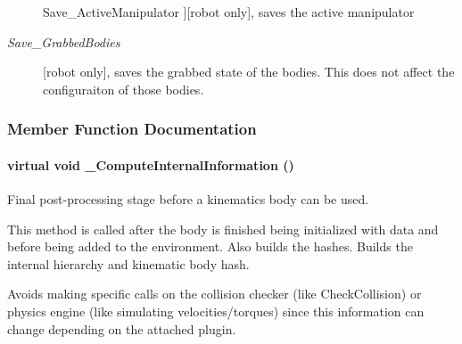 \begin{Desc}
\begin{description}
{\hypertarget{classOpenRAVE_1_1KinBody_ac26237c033a41ea5d14733a01e1dd388abfdea67aabc497c0ecd461a332cf17e1}{
Save\_\-ActiveManipulator}
\label{classOpenRAVE_1_1KinBody_ac26237c033a41ea5d14733a01e1dd388abfdea67aabc497c0ecd461a332cf17e1}
}]\mbox{[}robot only\mbox{]}, saves the active manipulator \item[{\em 
\hypertarget{classOpenRAVE_1_1KinBody_ac26237c033a41ea5d14733a01e1dd388aa8b99f22784feffbd182ad71f8eb8a6f}{
Save\_\-GrabbedBodies}
\label{classOpenRAVE_1_1KinBody_ac26237c033a41ea5d14733a01e1dd388aa8b99f22784feffbd182ad71f8eb8a6f}
}]\mbox{[}robot only\mbox{]}, saves the grabbed state of the bodies. This does not affect the configuraiton of those bodies. \end{description}
\end{Desc}



\subsubsection{Member Function Documentation}
\hypertarget{classOpenRAVE_1_1KinBody_a3a10edb8cb573ac97bfed0e05dc2a29a}{
\paragraph[{\_\-ComputeInternalInformation}]{\setlength{\rightskip}{0pt plus 5cm}virtual void \_\-ComputeInternalInformation ()}\hfill}
\label{classOpenRAVE_1_1KinBody_a3a10edb8cb573ac97bfed0e05dc2a29a}


Final post-\/processing stage before a kinematics body can be used. 

This method is called after the body is finished being initialized with data and before being added to the environment. Also builds the hashes. Builds the internal hierarchy and kinematic body hash.

Avoids making specific calls on the collision checker (like CheckCollision) or physics engine (like simulating velocities/torques) since this information can change depending on the attached plugin. 

